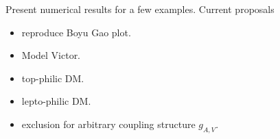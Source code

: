 Present numerical results for a few examples. Current proposals

\begin{itemize}
\item reproduce Boyu Gao plot.
\item Model Victor.
\item top-philic DM.
\item lepto-philic DM.
\item exclusion for arbitrary coupling structure $g_{A,V}$.
\end{itemize}